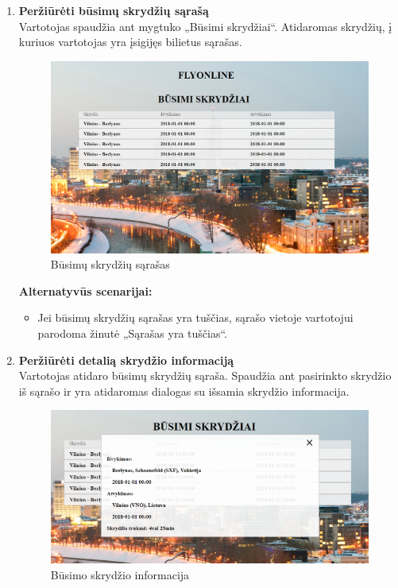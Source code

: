 \documentclass{VUMIFPSkursinis}
\begin{document}
\begin{enumerate}[label=\textbf{U\arabic*}.]
                    \item \textbf{Peržiūrėti būsimų skrydžių sąrašą}\\
                    Vartotojas spaudžia ant mygtuko „Būsimi skrydžiai“. Atidaromas skrydžių, į kuriuos vartotojas yra įsigijęs bilietus sąrašas.
                    \begin{figure}[H]	
                        \centering
                        \includegraphics[scale=0.6]{img/history}	
                        \caption{Būsimų skrydžių sąrašas}	
                        \label{Būsimų skrydžių sąrašas}	
                    \end{figure}
                    \textbf{Alternatyvūs scenarijai:}
                    \begin{itemize}
                        \item Jei būsimų skrydžių sąrašas yra tuščias, sąrašo vietoje vartotojui parodoma žinutė „Sąrašas yra tuščias“.
                    \end{itemize}

                    \item \textbf{Peržiūrėti detalią skrydžio informaciją}\\
                    Vartotojas atidaro būsimų skrydžių sąraša. Spaudžia ant pasirinkto skrydžio iš sąrašo ir yra atidaromas dialogas su išsamia skrydžio informacija.
                    \begin{figure}[H]	
                        \centering
                        \includegraphics[scale=0.6]{img/details}	
                        \caption{Būsimo skrydžio informacija}	
                        \label{figure:Būsimo skrydžio informacija}	
                    \end{figure}
                    

\end{enumerate}
\end{document}
